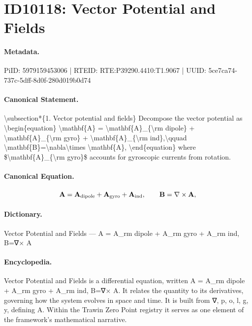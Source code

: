 \section*{ID10118: Vector Potential and Fields}
\paragraph{Metadata.}
PiID: 5979159453006 | RTEID: RTE:P39290.4410:T1.9067 | UUID: 5ce7ca74-737c-5dff-8d0f-280d019b0d74

\paragraph{Canonical Statement.}
\textbackslash{}subsection*\{1. Vector potential and fields\} Decompose the vector potential as \textbackslash{}begin\{equation\} \textbackslash{}mathbf\{A\} = \textbackslash{}mathbf\{A\}\_\{\textbackslash{}rm dipole\} + \textbackslash{}mathbf\{A\}\_\{\textbackslash{}rm gyro\} + \textbackslash{}mathbf\{A\}\_\{\textbackslash{}rm ind\},\textbackslash{}qquad \textbackslash{}mathbf\{B\}=\textbackslash{}nabla\textbackslash{}times \textbackslash{}mathbf\{A\}, \textbackslash{}end\{equation\} where \$\textbackslash{}mathbf\{A\}\_\{\textbackslash{}rm gyro\}\$ accounts for gyroscopic currents from rotation.

\paragraph{Canonical Equation.}
\[
\mathbf{A} = \mathbf{A}_{\rm dipole} + \mathbf{A}_{\rm gyro} + \mathbf{A}_{\rm ind},\qquad \mathbf{B}=\nabla\times \mathbf{A},
\]

\paragraph{Dictionary.}
Vector Potential and Fields — A = A\_rm dipole + A\_rm gyro + A\_rm ind, B=∇× A

\paragraph{Encyclopedia.}
Vector Potential and Fields is a differential equation, written A = A\_rm dipole + A\_rm gyro + A\_rm ind, B=∇× A. It relates the quantity to its derivatives, governing how the system evolves in space and time. It is built from ∇, p, o, l, g, y, defining A. Within the Trawin Zero Point registry it serves as one element of the framework's mathematical narrative.
